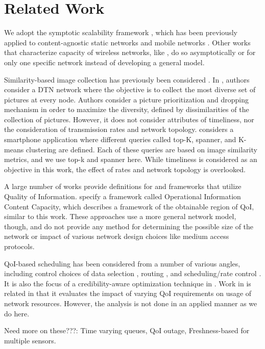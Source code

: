 
\section{Related Work}
\label{sec:related_work}


We adopt the symptotic scalability framework \cite{scalability_manets_theory_vs_practice}, which has been previously applied to content-agnostic static networks \cite{symptotics_framework_scalability} and mobile networks \cite{scal_analysis_mobility}.  Other works that characterize capacity of wireless networks, like \cite{li_capacity, gupta2000capacity, nom_cap_wmns}, do so asymptotically or for only one specific network instead of developing a general model.

Similarity-based image collection has previously been considered \cite{photonet,media scope}. In \cite{photonet}, authors consider a DTN network where the objective is to collect the most diverse set of pictures at every node.  Authors consider a picture prioritization and dropping mechanism in order to maximize the diversity, defined by dissimilarities of the collection of pictures. However, it does not consider attributes of timeliness, nor the consideration of transmission rates and network topology.  \cite{mediascope} considers a smartphone application where different queries called top-K, spanner, and K-means clustering are defined.  Each of these queries are based on image similarity metrics, and we use top-k and spanner here. While timeliness is considered as an objective in this work, the effect of rates and network topology is overlooked.

A large number of works provide definitions for and frameworks that utilize Quality of Information.  \cite{qoi_aware_tactical_mil_nets, qoi_aware_trx_pol_time_vary_links} specify a framework called Operational Information Content Capacity, which describes a framework of the obtainable region of QoI, similar to this work.  These approaches use a more general network model, though, and do not provide any method for determining the possible size of the network or impact of various network design choices like medium access protocols.  

QoI-based scheduling has been considered from a number of various angles, including control choices of data selection \cite{dcoss_max_cov, opt_qoi_data_collection_bijarbooneh}, routing \cite{quality_aware_routing_tan}, and scheduling/rate control \cite{qoi_sched_task_proc_nets, toward_qoi_rate_control}.  It is also the focus of a credibility-aware optimization technique in \cite{social_swarming}.  Work in \cite{qoi_aware_mobile_apps} is related in that it evaluates the impact of varying QoI requirements on usage of network resources.  However, the analysis is not done in an applied manner as we do here. 

Need more on these???:  Time varying queues, QoI outage, Freshness-based for multiple sensors.  
